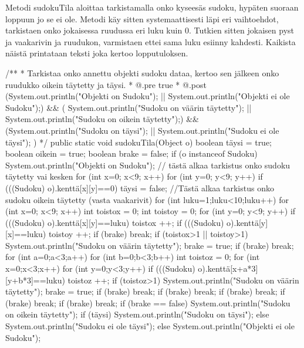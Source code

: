 Metodi sudokuTila aloittaa tarkistamalla onko kyseesäs sudoku, hypäten suoraan loppuun jo se ei ole. Metodi käy
sitten systemaattisesti läpi eri vaihtoehdot, tarkistaen onko jokaisessa ruudussa eri luku kuin 0. Tutkien sitten
jokaisen pyst ja vaakarivin ja ruudukon, varmistaen ettei sama luku esiinny kahdesti. Kaikista näistä printataan
teksti joka kertoo lopputuloksen.
\begin{javacode}
/**
   * Tarkistaa onko annettu objekti sudoku dataa, kertoo sen
     jälkeen onko ruudukko oikein täytetty ja täysi.
   * @.pre true
   * @.post (System.out.println("Objekti on Sudoku"); ||
     System.out.println("Objekti ei ole Sudoku");) &&
     ( System.out.println("Sudoku on väärin täytetty"); ||
     System.out.println("Sudoku on oikein täytetty");) &&
     (System.out.println("Sudoku on täysi"); ||
     System.out.println("Sudoku ei ole täysi"); )
   */
  public static void sudokuTila(Object o){
    boolean täysi = true;
    boolean oikein = true;
    boolean brake = false;
    if (o instanceof Sudoku) {
        System.out.println("Objekti on Sudoku");
        // tästä alkaa tarkistus onko sudoku
         täytetty vai kesken
        for (int x=0; x<9; x++) {
          for (int y=0; y<9; y++) {
            if (((Sudoku) o).kenttä[x][y]==0) {
              täysi = false;
            }
          }
        }
        //Tästä alkaa tarkistus onko sudoku oikein
        täytetty (vasta vaakarivit)
        for (int luku=1;luku<10;luku++) {
          for (int x=0; x<9; x++) {
            int toistox = 0;
            int toistoy = 0;
            for (int y=0; y<9; y++) {
              if (((Sudoku) o).kenttä[x][y]==luku) {
                toistox ++;
              }
              if (((Sudoku) o).kenttä[y][x]==luku) {
                toistoy ++;
              }
            }
            if (brake){
              break;
            }
            if (toistox>1 || toistoy>1) {
              System.out.println("Sudoku on väärin
              täytetty");
              brake = true;
            }
          }
          if (brake){
            break;
          }
          for (int a=0;a<3;a++) {
            for (int b=0;b<3;b++) {
              int toistoz = 0;
              for (int x=0;x<3;x++) {
                for (int y=0;y<3;y++) {
                  if (((Sudoku) o).kenttä[x+a*3]
                  [y+b*3]==luku) {
                    toistoz ++;
                  }
                  if (toistoz>1) {
                    System.out.println("Sudoku
                    on väärin täytetty");
                    brake = true;
                  }
                  if (brake){
                    break;
                  }
                }
                if (brake){
                  break;
                }
               }
              if (brake){
                break;
              }
            }
            if (brake){
              break;
            }
          }
          if (brake){
            break;
          }
        }
        if (brake == false) {
          System.out.println("Sudoku on oikein
          täytetty");
        }
        if (täysi) {
          System.out.println("Sudoku on täysi");
        }else {
          System.out.println("Sudoku ei ole täysi");
        }
      }else {
        System.out.println("Objekti ei ole Sudoku");
      }
    }
\end{javacode}
